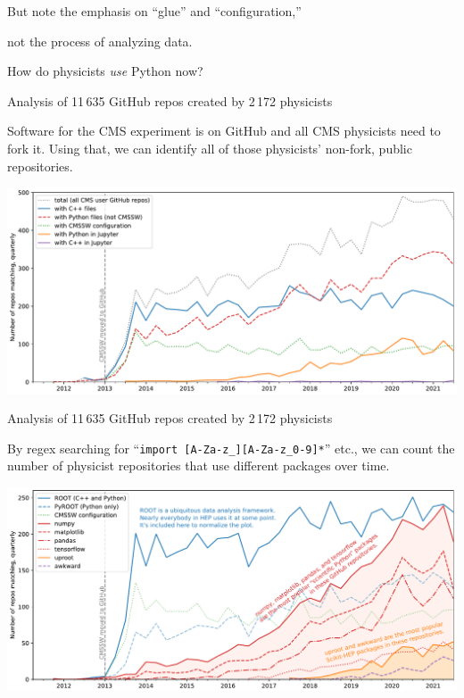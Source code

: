 \documentclass[aspectratio=169]{beamer}
\begin{document}
\begin{frame}{}
\vspace{1 cm}
\Large

\begin{center}
But note the emphasis on ``glue'' and ``configuration,''

\vspace{0.1 cm}
not the process of analyzing data.

\vspace{1 cm}
How do physicists {\it use} Python now?
\end{center}
\end{frame}

\begin{frame}{Analysis of 11\,635 GitHub repos created by 2\,172 physicists}
\vspace{0.25 cm}

Software for the CMS experiment is on GitHub and all CMS physicists need to fork it. Using that, we can identify all of those physicists' non-fork, public repositories.

\vspace{0.2 cm}

\includegraphics[width=\linewidth]{PLOTS/gihub-language-fullstudy.pdf}
\end{frame}

\begin{frame}{Analysis of 11\,635 GitHub repos created by 2\,172 physicists}
\vspace{0.25 cm}

By regex searching for ``\texttt{import [A-Za-z_][A-Za-z_0-9]*}'' etc., we can count the number of physicist repositories that use different packages over time.

\vspace{0.2 cm}

\includegraphics[width=\linewidth]{PLOTS/gihub-package-fullstudy.pdf}
\end{frame}
\end{document}
